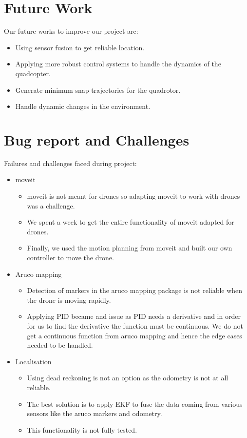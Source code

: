 \documentclass[a4paper,12pt,oneside]{book}
\begin{document}
\chapter[Future Work]{Future Work}
Our future works to improve our project are:\\
\begin{itemize}
\item Using sensor fusion to get reliable location.
\item Applying more robust control systems to handle the dynamics of the quadcopter.
\item Generate minimum snap trajectories for the quadrotor.
\item Handle dynamic changes in the environment.
\end{itemize}

\pagebreak

\chapter[Bug report and Challenges]{Bug report and Challenges}


Failures and challenges faced during project:\\
\begin{itemize}
\item moveit
\begin{itemize}
\item moveit is not meant for drones so adapting moveit to work with drones was a challenge.
\item We spent a week to get the entire functionality of moveit adapted for drones.
\item Finally, we used the motion planning from moveit and built our own controller to move the drone.
\end{itemize}

\item Aruco mapping
\begin{itemize}
\item Detection of markers in the aruco mapping package is not reliable when the drone is moving rapidly.
\item Applying PID became and issue as PID needs a derivative and in order for us to find the derivative the function must be continuous. We do not get a continuous function from aruco mapping and hence the edge cases needed to be handled.
\end{itemize}

\item Localisation
\begin{itemize}
\item Using dead reckoning is not an option as the odometry is not at all reliable.
\item The best solution is to apply EKF to fuse the data coming from various sensors like the aruco markers and odometry.
\item This functionality is not fully tested.
\end{itemize}

\end{itemize}
\end{document}
